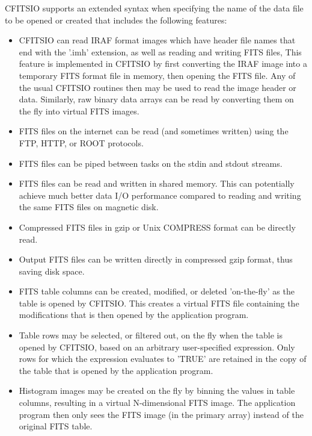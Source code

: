 \documentclass[11pt]{book}
\begin{document}
CFITSIO supports an extended syntax when specifying the name of the
data file to be opened or created  that includes the following
features:

\begin{itemize}
\item
CFITSIO can read IRAF format images which have header file names that
end with the '.imh' extension, as well as reading and writing FITS
files,   This feature is implemented in CFITSIO by first converting the
IRAF image into a temporary FITS format file in memory, then opening
the FITS file.  Any of the usual CFITSIO routines then may be used to
read the image header or data.  Similarly, raw binary data arrays can
be read by converting them on the fly into virtual FITS images.

\item
FITS files on the internet can be read (and sometimes written) using the FTP,
HTTP, or ROOT protocols.

\item
FITS files can be piped between tasks on the stdin and stdout streams.

\item
FITS files can be read and written in shared memory.  This can potentially
achieve much better data I/O performance compared to reading and
writing the same FITS files on magnetic disk.

\item
Compressed FITS files in gzip or Unix COMPRESS format can be directly read.

\item
Output FITS files can be written directly in compressed gzip format,
thus saving disk space.

\item
FITS table columns can be created, modified, or deleted 'on-the-fly' as
the table is opened by CFITSIO.  This creates a virtual FITS file containing
the modifications that is then opened by the application program.

\item
Table rows may be selected, or filtered out, on the fly when the table
is opened by CFITSIO, based on an arbitrary user-specified expression.
Only rows for which the expression evaluates to 'TRUE' are retained
in the copy of the table that is opened by the application program.

\item
Histogram images may be created on the fly by binning the values in
table columns, resulting in a virtual N-dimensional FITS image.  The
application program then only sees the FITS image (in the primary
array) instead of the original FITS table.
\end{itemize}
\end{document}

